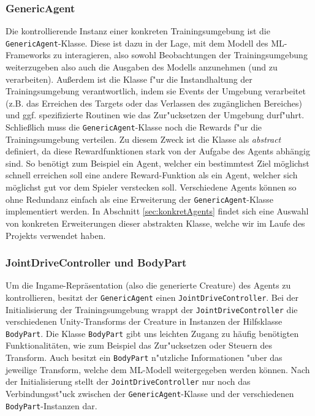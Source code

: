 \subsubsection{GenericAgent}

Die kontrollierende Instanz einer konkreten Trainingsumgebung ist die \texttt{GenericAgent}-Klasse. Diese ist dazu in der Lage, mit dem Modell des ML-Frameworks zu interagieren, also sowohl Beobachtungen der Trainingsumgebung weiterzugeben also auch die Ausgaben des Modells anzunehmen (und zu verarbeiten). Außerdem ist die Klasse f"ur die Instandhaltung der Trainingsumgebung verantwortlich, indem sie Events der Umgebung verarbeitet (z.B. das Erreichen des Targets oder das Verlassen des zugänglichen Bereiches) und ggf. spezifizierte Routinen wie das Zur"ucksetzen der Umgebung durf"uhrt.
Schließlich muss die \texttt{GenericAgent}-Klasse noch die Rewards f"ur die Trainingsumgebung verteilen. Zu diesem Zweck ist die Klasse als \textit{abstract} definiert, da diese Rewardfunktionen stark von der Aufgabe des Agents abhängig sind. So benötigt zum Beispiel ein Agent, welcher ein bestimmtest Ziel möglichst schnell erreichen soll eine andere Reward-Funktion als ein Agent, welcher sich möglichst gut vor dem Spieler verstecken soll. Verschiedene Agents können so ohne Redundanz einfach als eine Erweiterung der \texttt{GenericAgent}-Klasse implementiert werden. In Abschnitt \ref{sec:konkretAgents} findet sich eine Auswahl von konkreten Erweiterungen dieser abstrakten Klasse, welche wir im Laufe des Projekts verwendet haben.


\subsubsection{JointDriveController und BodyPart}

Um die Ingame-Repräsentation (also die generierte Creature) des Agents zu kontrollieren, besitzt der \texttt{GenericAgent} einen \texttt{JointDriveController}. Bei der Initialisierung der Trainingsumgebung wrappt der \texttt{JointDriveController} die verschiedenen Unity-Transforms der Creature in Instanzen der Hilfsklasse \texttt{BodyPart}. Die Klasse \texttt{BodyPart} gibt uns leichten Zugang zu häufig benötigten Funktionalitäten, wie zum Beispiel das Zur"ucksetzen oder Steuern des Transform. Auch besitzt ein \texttt{BodyPart} n"utzliche Informationen "uber das jeweilige Transform, welche dem ML-Modell weitergegeben werden können. Nach der Initialisierung stellt der \texttt{JointDriveController} nur noch das Verbindungsst"uck zwischen der \texttt{GenericAgent}-Klasse und der verschiedenen \texttt{BodyPart}-Instanzen dar. 


